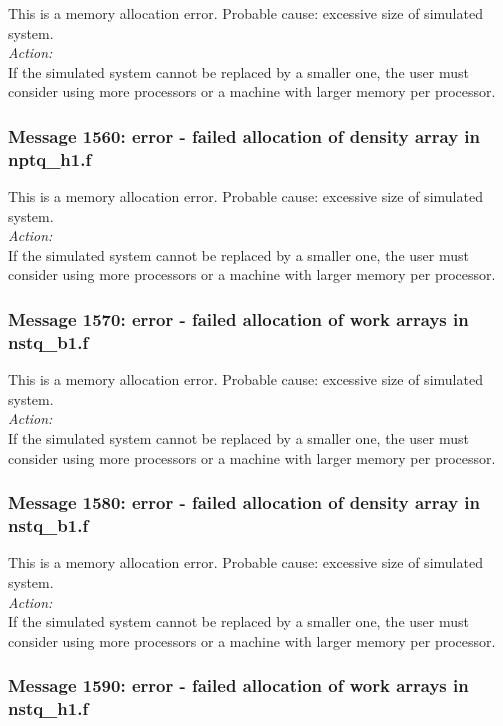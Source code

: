 This is a memory allocation error. Probable cause: excessive size of
simulated system. \\

\noindent
{\em Action:}\\
If the simulated system cannot be replaced by a smaller one, the user
must consider using more processors or a machine with larger memory
per processor.

\subsubsection*{Message 1560: error - failed allocation of density
array in nptq\_h1.f}

This is a memory allocation error. Probable cause: excessive size of
simulated system. \\

\noindent
{\em Action:}\\
If the simulated system cannot be replaced by a smaller one, the user
must consider using more processors or a machine with larger memory
per processor.

\subsubsection*{Message 1570: error - failed allocation of work arrays
in nstq\_b1.f}

This is a memory allocation error. Probable cause: excessive size of
simulated system. \\

\noindent
{\em Action:}\\
If the simulated system cannot be replaced by a smaller one, the user
must consider using more processors or a machine with larger memory
per processor.

\subsubsection*{Message 1580: error - failed allocation of density
array in nstq\_b1.f}

This is a memory allocation error. Probable cause: excessive size of
simulated system. \\

\noindent
{\em Action:}\\
If the simulated system cannot be replaced by a smaller one, the user
must consider using more processors or a machine with larger memory
per processor.

\subsubsection*{Message 1590: error - failed allocation of work arrays
in nstq\_h1.f}

